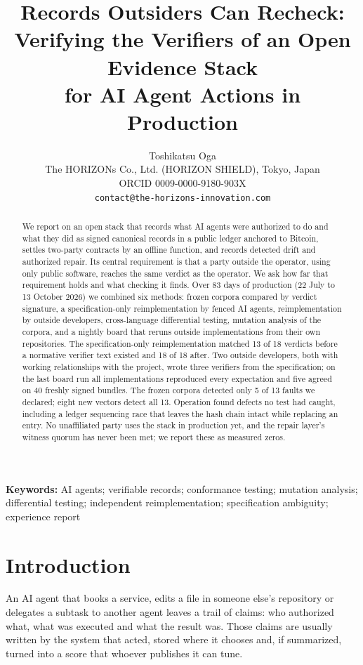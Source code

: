 \documentclass[11pt,a4paper]{article}
\title{Records Outsiders Can Recheck:\\
Verifying the Verifiers of an Open Evidence Stack\\
for AI Agent Actions in Production}
\author{Toshikatsu Oga\\
\small The HORIZONs Co., Ltd. (HORIZON SHIELD), Tokyo, Japan\\
\small ORCID 0009-0000-9180-903X\\
\small \texttt{contact@the-horizons-innovation.com}}
\date{}
\begin{document}
\maketitle

\begin{abstract}
\noindent We report on an open stack that records what AI agents were authorized to do and what they did as signed canonical records in a public ledger anchored to Bitcoin, settles two-party contracts by an offline function, and records detected drift and authorized repair. Its central requirement is that a party outside the operator, using only public software, reaches the same verdict as the operator. We ask how far that requirement holds and what checking it finds. Over 83 days of production (22 July to 13 October 2026) we combined six methods: frozen corpora compared by verdict signature, a specification-only reimplementation by fenced AI agents, reimplementation by outside developers, cross-language differential testing, mutation analysis of the corpora, and a nightly board that reruns outside implementations from their own repositories. The specification-only reimplementation matched 13 of 18 verdicts before a normative verifier text existed and 18 of 18 after. Two outside developers, both with working relationships with the project, wrote three verifiers from the specification; on the last board run all implementations reproduced every expectation and five agreed on 40 freshly signed bundles. The frozen corpora detected only 5 of 13 faults we declared; eight new vectors detect all 13. Operation found defects no test had caught, including a ledger sequencing race that leaves the hash chain intact while replacing an entry. No unaffiliated party uses the stack in production yet, and the repair layer's witness quorum has never been met; we report these as measured zeros.
\end{abstract}

\noindent\textbf{Keywords:} AI agents; verifiable records; conformance testing; mutation analysis; differential testing; independent reimplementation; specification ambiguity; experience report

\section{Introduction}

An AI agent that books a service, edits a file in someone else's repository or delegates a subtask to another agent leaves a trail of claims: who authorized what, what was executed and what the result was. Those claims are usually written by the system that acted, stored where it chooses and, if summarized, turned into a score that whoever publishes it can tune.
\end{document}
